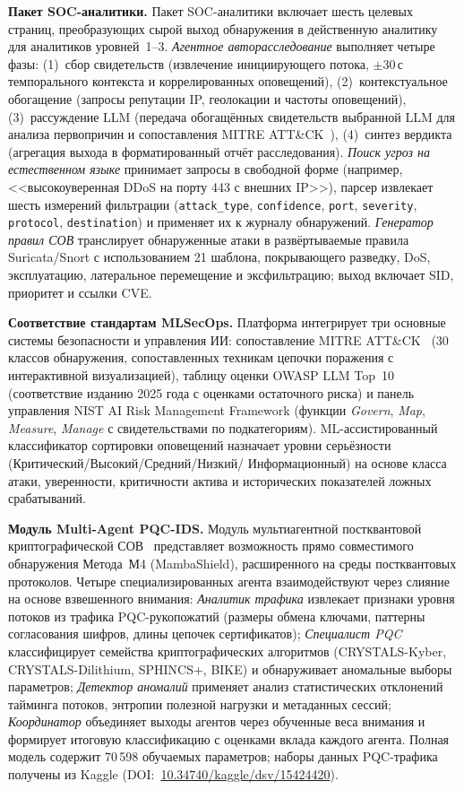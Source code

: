 \noindent\textbf{Пакет SOC-аналитики.} Пакет SOC-аналитики включает
шесть целевых страниц, преобразующих сырой выход обнаружения в
действенную аналитику для аналитиков уровней~1--3. \emph{Агентное
авторасследование} выполняет четыре фазы: (1)~сбор свидетельств
(извлечение инициирующего потока, $\pm$30\,с темпорального контекста
и коррелированных оповещений), (2)~контекстуальное обогащение
(запросы репутации IP, геолокации и частоты оповещений),
(3)~рассуждение LLM (передача обогащённых свидетельств выбранной
LLM для анализа первопричин и сопоставления MITRE
ATT\&CK~\cite{Hernandez2015}), (4)~синтез вердикта (агрегация
выхода в форматированный отчёт расследования). \emph{Поиск угроз
на естественном языке} принимает запросы в свободной форме
(например, <<высокоуверенная DDoS на порту 443 с внешних IP>>),
парсер извлекает шесть измерений фильтрации (\texttt{attack\_type},
\texttt{confidence}, \texttt{port}, \texttt{severity},
\texttt{protocol}, \texttt{destination}) и применяет их к журналу
обнаружений. \emph{Генератор правил СОВ} транслирует обнаруженные
атаки в развёртываемые правила Suricata/Snort с использованием 21
шаблона, покрывающего разведку, DoS, эксплуатацию, латеральное
перемещение и эксфильтрацию; выход включает SID, приоритет и
ссылки CVE.

\noindent\textbf{Соответствие стандартам MLSecOps.} Платформа
интегрирует три основные системы безопасности и управления ИИ:
сопоставление MITRE ATT\&CK~\cite{Hernandez2015} (30 классов
обнаружения, сопоставленных техникам цепочки поражения с
интерактивной визуализацией), таблицу оценки OWASP LLM
Top~10~\cite{Xiong2020} (соответствие изданию 2025 года с оценками
остаточного риска) и панель управления NIST AI Risk Management
Framework (функции \emph{Govern}, \emph{Map}, \emph{Measure},
\emph{Manage} с свидетельствами по подкатегориям).
ML-ассистированный классификатор сортировки оповещений назначает
уровни серьёзности (Критический/Высокий/Средний/Низкий/
Информационный) на основе класса атаки, уверенности, критичности
актива и исторических показателей ложных срабатываний.

\noindent\textbf{Модуль Multi-Agent PQC-IDS.} Модуль
мультиагентной постквантовой криптографической СОВ~\cite{Anaedevha2026mapqc,NIST2024}
представляет возможность прямо совместимого обнаружения Метода~М4
(MambaShield), расширенного на среды постквантовых протоколов.
Четыре специализированных агента взаимодействуют через слияние на
основе взвешенного внимания: \emph{Аналитик трафика} извлекает
признаки уровня потоков из трафика PQC-рукопожатий (размеры обмена
ключами, паттерны согласования шифров, длины цепочек сертификатов);
\emph{Специалист PQC} классифицирует семейства криптографических
алгоритмов (CRYSTALS-Kyber, CRYSTALS-Dilithium, SPHINCS+, BIKE) и
обнаруживает аномальные выборы параметров; \emph{Детектор аномалий}
применяет анализ статистических отклонений тайминга потоков,
энтропии полезной нагрузки и метаданных сессий; \emph{Координатор}
объединяет выходы агентов через обученные веса внимания и формирует
итоговую классификацию с оценками вклада каждого агента. Полная
модель содержит 70\,598 обучаемых параметров; наборы данных
PQC-трафика получены из Kaggle (DOI:~\url{10.34740/kaggle/dsv/15424420}).

